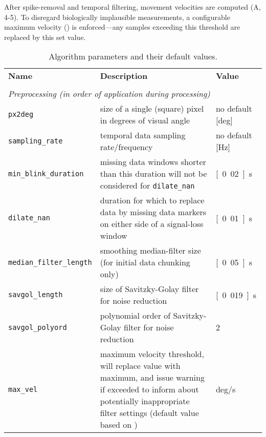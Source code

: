 After spike-removal and temporal filtering, movement velocities are computed
(A, 4-5). To disregard biologically implausible measurements, a
configurable maximum velocity () is enforced---any samples
exceeding this threshold are replaced by this set value.

\begin{table*}[tbp]
  \caption{Algorithm parameters and their default values.}
  \label{tab:parameters}
  \small
  \begin{tabular}{lp{85mm}l}
    \textbf{Name} & \textbf{Description} & \textbf{Value} \\
    & & \\
    \multicolumn{3}{l}{\textit{Preprocessing (in order of application during processing)}} \\
    \texttt{px2deg} &
    size of a single (square) pixel in degrees of visual angle &
    no default [\unit{deg}]\\
    \texttt{sampling\_rate} &
    temporal data sampling rate/frequency &
    no default [\unit{Hz}]\\
    \texttt{min\_blink\_duration} &
    missing data windows shorter than this duration will not be considered for \texttt{dilate\_nan}&
    \unit[0.02]{s}\\
    \texttt{dilate\_nan} &
    duration for which to replace data by missing data markers on either side of a
    signal-loss window &
    \unit[0.01]{s}\\
    \texttt{median\_filter\_length} &
    smoothing median-filter size (for initial data chunking only) &
    \unit[0.05]{s}\\
    \texttt{savgol\_length} &
    size of Savitzky-Golay filter for noise reduction&
    \unit[0.019]{s}\\
    \texttt{savgol\_polyord} &
    polynomial order of Savitzky-Golay filter for noise reduction&
    2\\
    \texttt{max\_vel} &
    maximum velocity threshold, will replace value with maximum, and issue
    warning if exceeded to inform about
    potentially inappropriate filter settings
    (default value based on \cite{holmqvist2011eye})&
    \unit[1000]{deg/s}\\


\end{tabular}
\end{table*}
